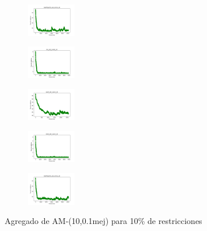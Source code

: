 \begin{figure}[H]
\begin{subfigure}
        \centering
        \includegraphics[width=0.234\textwidth]{img/am01mej/newthyroid_set_const_10_49258669_cost.png}
    \end{subfigure}
    \hfill
    \begin{subfigure}
        \centering
        \includegraphics[width=0.234\textwidth]{img/am01mej/iris_set_const_10_3773969821_cost.png}
    \end{subfigure}
    \hfill
    \begin{subfigure}
        \centering
        \includegraphics[width=0.234\textwidth]{img/am01mej/ecoli_set_const_10_3773969821_cost.png}
    \end{subfigure}
    \hfill
    \begin{subfigure}
        \centering
        \includegraphics[width=0.234\textwidth]{img/am01mej/rand_set_const_10_3773969821_cost.png}
    \end{subfigure}
    \hfill
    \begin{subfigure}
        \centering
        \includegraphics[width=0.234\textwidth]{img/am01mej/newthyroid_set_const_10_3773969821_cost.png}
    \end{subfigure}
    \caption{Agregado de AM-(10,0.1mej) para 10\% de restricciones}
\end{figure}

